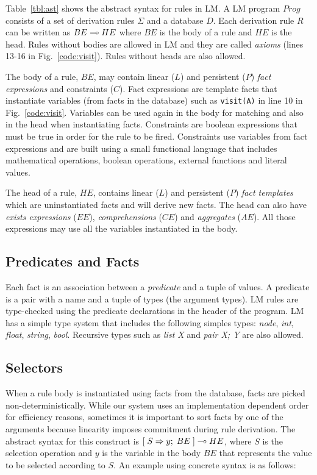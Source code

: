 \renewcommand{\arraystretch}{1.0}

Table~\ref{tbl:ast} shows the abstract syntax for rules in LM.
A LM program $Prog$ consists of a set of derivation rules $\Sigma$ and a database $D$.
Each derivation rule $R$ can be written as $BE \multimap HE$ where $BE$ is the body of a rule and
$HE$ is the head. Rules without bodies are allowed in LM and they are called \textit{axioms} (lines 13-16 in Fig.~\ref{code:visit}). Rules without heads are also allowed.

The body of a rule, $BE$, may contain linear ($L$) and persistent ($P$) \emph{fact expressions}
and constraints ($C$). Fact expressions are template facts that instantiate variables
(from facts in the database)
such as \texttt{visit(A)} in line 10 in Fig.~\ref{code:visit}. Variables can be used again in the body for matching and
also in the head when instantiating facts. Constraints are boolean expressions that must
be true in order for the rule to be fired. Constraints use variables from fact expressions and are built using a small functional language that includes mathematical operations, boolean operations, external functions and literal values.

The head of a rule, $HE$, contains linear ($L$) and persistent ($P$) \emph{fact templates} which are uninstantiated facts and will derive new facts. The head can also have \emph{exists expressions} ($EE$), \emph{comprehensions} ($CE$) and \emph{aggregates} ($AE$). All those expressions
may use all the variables instantiated in the body.

\subsection{Predicates and Facts}

Each fact is an association between a \emph{predicate} and a tuple of values. A predicate is a pair with a name and a tuple of types (the argument types). LM rules are type-checked using the predicate declarations in the header of the program. LM has a simple type system that includes the following simples types: \emph{node}, \emph{int}, \emph{float}, \emph{string}, \emph{bool}. Recursive types such as \emph{list X} and \emph{pair X; Y} are
also allowed.

\subsection{Selectors}

When a rule body is instantiated using facts from the database, facts are picked
non-deterministically. While our system uses an implementation dependent order for
efficiency reasons, sometimes it is important to sort facts by one of the arguments
because linearity imposes commitment during rule derivation. The abstract syntax for
this construct is $[\; S \Rightarrow y; \; BE \;] \multimap HE$, where
$S$ is the selection operation and $y$ is the variable in the body $BE$ that
represents the value to be selected according to $S$.
An example using concrete syntax is as follows:

